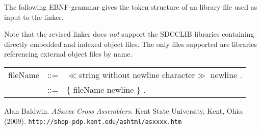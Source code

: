 \documentclass[10pt]{article}
\newenvironment{grammar}{\begin{tabular}{rcp{8cm}}}
                        {\end{tabular}}
\newcommand{\url}[1]{\texttt{\color{blue}#1}}
\begin{document}
The following EBNF-grammar gives the token structure of an library file
used as input to the linker.

Note that the revised linker does \emph{not} support the SDCCLIB
libraries containing directly embedded and indexed object files.  The
only files supported are libraries referencing external object files
by name.

\begin{grammar}
  fileName&::=&$\ll$string without newline character$\gg$ newline .\\
  \underbar{libraryFile}&::=&\{ fileName newline \} .\\
\end{grammar}



\begin{thebibliography}{Baldwin09}
    {Alan Baldwin.} \textit{ASxxxx Cross Assemblers.}
    Kent State University, Kent, Ohio. (2009).
    \url{http://shop-pdp.kent.edu/ashtml/asxxxx.htm}
\end{thebibliography}
\end{document}
